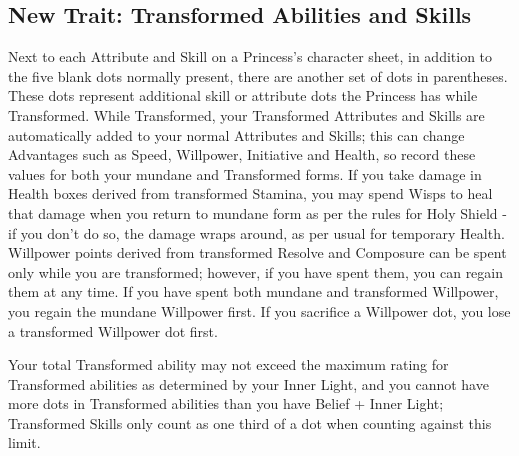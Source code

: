 \subsection*{New Trait: Transformed Abilities and Skills}
Next to each Attribute and Skill on a Princess's character sheet, in addition to the five blank dots normally present, there are another set of dots in parentheses. These dots represent additional skill or attribute dots the Princess has while Transformed. While Transformed, your Transformed Attributes and Skills are automatically added to your normal Attributes and Skills; this can change Advantages such as Speed, Willpower, Initiative and Health, so record these values for both your mundane and Transformed forms. If you take damage in Health boxes derived from transformed Stamina, you may spend Wisps to heal that damage when you return to mundane form as per the rules for Holy Shield - if you don't do so, the damage wraps around, as per usual for temporary Health. Willpower points derived from transformed Resolve and Composure can be spent only while you are transformed; however, if you have spent them, you can regain them at any time. If you have spent both mundane and transformed Willpower, you regain 
the 
mundane Willpower first. If you sacrifice a Willpower dot, you lose a transformed Willpower dot first.

Your total Transformed ability may not exceed the maximum rating for Transformed abilities as determined by your Inner Light, and you cannot have more dots in Transformed abilities than you have Belief + Inner Light; Transformed Skills only count as one third of a dot when counting against this limit. 


